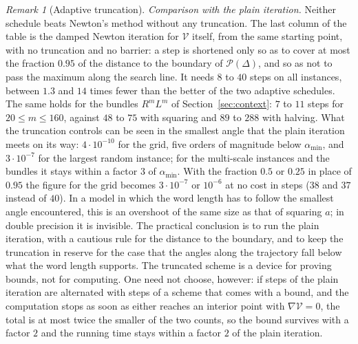 \documentclass[11pt]{amsart}
\theoremstyle{definition}
\theoremstyle{remark}
\newtheorem{remark}[theorem]{Remark}
\begin{document}
\begin{remark}[Adaptive truncation]
\emph{Comparison with the plain iteration.} Neither schedule beats Newton's method without any truncation. The last column of the table is the damped Newton iteration for $\mathcal V$ itself, from the same starting point, with no truncation and no barrier: a step is shortened only so as to cover at most the fraction $0.95$ of the distance to the boundary of $\mathcal P(\Delta)$,
and so as not to pass the maximum along the search line. It needs $8$ to $40$ steps on all instances, between $1.3$ and $14$ times fewer than the better of the two adaptive schedules. The same holds for the bundles $R^mL^m$ of Section~\ref{sec:context}: $7$ to $11$ steps for $20\le m\le160$, against $48$ to $75$ with squaring and $89$ to $288$ with halving.
What the truncation controls can be seen in the smallest angle that the plain iteration meets on its way: $4\cdot10^{-10}$ for the grid, five orders of magnitude below $\alpha_{\min}$, and $3\cdot10^{-7}$ for the largest random instance; for the multi-scale instances and the bundles it stays within a factor $3$ of $\alpha_{\min}$.
With the fraction $0.5$ or $0.25$ in place of $0.95$ the figure for the grid becomes $3\cdot10^{-7}$ or $10^{-6}$ at no cost in steps ($38$ and $37$ instead of $40$). In a model in which the word length has to follow the smallest angle encountered, this is an overshoot of the same size as that of squaring $a$; in double precision it is invisible.
The practical conclusion is to run the plain iteration, with a cautious rule for the distance to the boundary, and to keep the truncation in reserve for the case that the angles along the trajectory fall below what the word length supports. The truncated scheme is a device for proving bounds, not for computing. One need not choose, however: if steps of the plain iteration are alternated with steps of a scheme that comes with a bound, and the computation stops as soon as either reaches an interior point with $\nabla\mathcal V=0$,
the total is at most twice the smaller of the two counts, so the bound survives with a factor $2$ and the running time stays within a factor $2$ of the plain iteration.


\end{remark}
\end{document}

